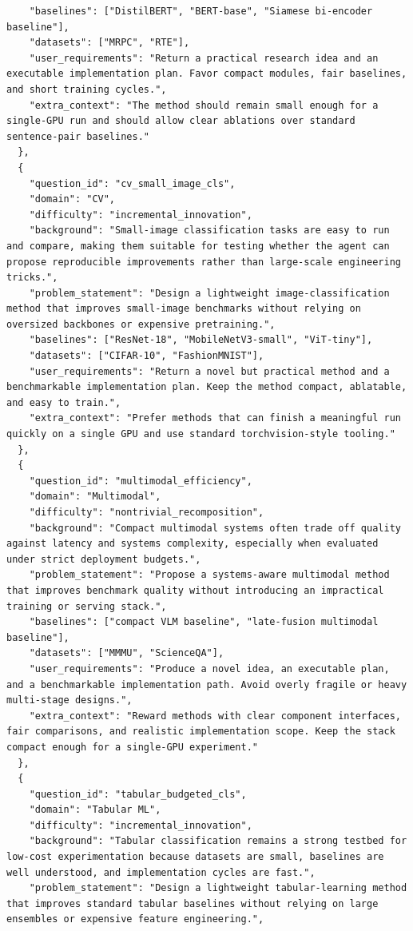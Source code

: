 \documentclass{opendatalab}
\begin{document}
\begin{lstlisting}
    "baselines": ["DistilBERT", "BERT-base", "Siamese bi-encoder baseline"],
    "datasets": ["MRPC", "RTE"],
    "user_requirements": "Return a practical research idea and an executable implementation plan. Favor compact modules, fair baselines, and short training cycles.",
    "extra_context": "The method should remain small enough for a single-GPU run and should allow clear ablations over standard sentence-pair baselines."
  },
  {
    "question_id": "cv_small_image_cls",
    "domain": "CV",
    "difficulty": "incremental_innovation",
    "background": "Small-image classification tasks are easy to run and compare, making them suitable for testing whether the agent can propose reproducible improvements rather than large-scale engineering tricks.",
    "problem_statement": "Design a lightweight image-classification method that improves small-image benchmarks without relying on oversized backbones or expensive pretraining.",
    "baselines": ["ResNet-18", "MobileNetV3-small", "ViT-tiny"],
    "datasets": ["CIFAR-10", "FashionMNIST"],
    "user_requirements": "Return a novel but practical method and a benchmarkable implementation plan. Keep the method compact, ablatable, and easy to train.",
    "extra_context": "Prefer methods that can finish a meaningful run quickly on a single GPU and use standard torchvision-style tooling."
  },
  {
    "question_id": "multimodal_efficiency",
    "domain": "Multimodal",
    "difficulty": "nontrivial_recomposition",
    "background": "Compact multimodal systems often trade off quality against latency and systems complexity, especially when evaluated under strict deployment budgets.",
    "problem_statement": "Propose a systems-aware multimodal method that improves benchmark quality without introducing an impractical training or serving stack.",
    "baselines": ["compact VLM baseline", "late-fusion multimodal baseline"],
    "datasets": ["MMMU", "ScienceQA"],
    "user_requirements": "Produce a novel idea, an executable plan, and a benchmarkable implementation path. Avoid overly fragile or heavy multi-stage designs.",
    "extra_context": "Reward methods with clear component interfaces, fair comparisons, and realistic implementation scope. Keep the stack compact enough for a single-GPU experiment."
  },
  {
    "question_id": "tabular_budgeted_cls",
    "domain": "Tabular ML",
    "difficulty": "incremental_innovation",
    "background": "Tabular classification remains a strong testbed for low-cost experimentation because datasets are small, baselines are well understood, and implementation cycles are fast.",
    "problem_statement": "Design a lightweight tabular-learning method that improves standard tabular baselines without relying on large ensembles or expensive feature engineering.",

\end{lstlisting}
\end{document}
